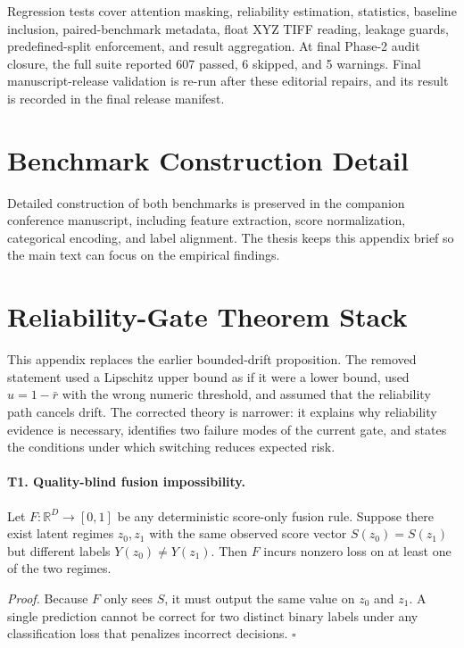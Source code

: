 \documentclass[11pt]{article}
\begin{document}
Regression tests cover attention masking, reliability estimation,
statistics, baseline inclusion, paired-benchmark metadata, float XYZ TIFF
reading, leakage guards, predefined-split enforcement, and result
aggregation. At final Phase-2 audit closure, the full suite reported 607 passed, 6 skipped, and 5 warnings. Final manuscript-release validation is re-run after these editorial repairs, and its result is recorded in the final release manifest.

\section{Benchmark Construction Detail}
\label{app:benchmark}

Detailed construction of both benchmarks is preserved in the companion
conference manuscript, including feature extraction, score normalization,
categorical encoding, and label alignment. The thesis keeps this appendix
brief so the main text can focus on the empirical findings.

\section{Reliability-Gate Theorem Stack}
\label{app:switching-rule}

This appendix replaces the earlier bounded-drift proposition. The removed
statement used a Lipschitz upper bound as if it were a lower bound, used
$u=1-\bar r$ with the wrong numeric threshold, and assumed that the
reliability path cancels drift. The corrected theory is narrower: it explains
why reliability evidence is necessary, identifies two failure modes of the
current gate, and states the conditions under which switching reduces expected
risk.

\paragraph{T1. Quality-blind fusion impossibility.}
Let $F:\mathbb{R}^{D}\rightarrow[0,1]$ be any deterministic score-only fusion
rule. Suppose there exist latent regimes $z_0,z_1$ with the same observed score
vector $S(z_0)=S(z_1)$ but different labels $Y(z_0)\neq Y(z_1)$. Then $F$
incurs nonzero loss on at least one of the two regimes.

\emph{Proof.} Because $F$ only sees $S$, it must output the same value on
$z_0$ and $z_1$. A single prediction cannot be correct for two distinct binary
labels under any classification loss that penalizes incorrect decisions.
\hfill$\square$
\end{document}
